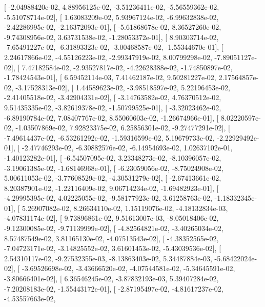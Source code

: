 \documentclass{article}
\begin{document}
       [ -2.04988420e-02,   4.88956125e-02,  -3.51236411e-02,
         -5.56559362e-02,  -5.51078714e-02],
       [  1.63083209e-02,   5.93967124e-02,  -6.99632838e-02,
         -2.42286995e-02,  -2.16372093e-01],
       [ -5.61868678e-02,   8.36527260e-02,  -9.74308956e-02,
          3.63731538e-02,  -1.28053372e-01],
       [  8.90303714e-02,  -7.65491227e-02,  -6.31893323e-02,
         -3.00468587e-02,  -1.55344670e-01],
       [  2.24617866e-02,  -4.55126223e-02,  -2.99347919e-02,
          8.00799298e-02,  -7.89051127e-02],
       [  7.47182584e-02,  -2.93527817e-02,  -4.22628388e-02,
         -1.74850897e-02,  -1.78424543e-01],
       [  6.59452114e-03,   7.41462187e-02,   9.50281227e-02,
          2.17564857e-02,  -3.17528313e-02],
       [  1.44589623e-02,  -3.98518597e-02,   5.22196453e-02,
         -2.41405518e-02,  -3.42904331e-02],
       [ -3.14763582e-02,   4.76370512e-02,   9.51435335e-02,
         -3.82619378e-02,  -1.50799525e-01],
       [ -3.32023462e-02,  -6.89190784e-02,   7.08407767e-02,
          8.55060603e-02,  -1.26674966e-01],
       [  8.02220597e-02,  -1.03507869e-02,   7.92823375e-02,
          6.25856301e-02,  -9.27477291e-02],
       [ -7.49614437e-02,  -6.53261292e-02,  -1.59316599e-02,
          5.19679733e-02,  -2.22929492e-01],
       [ -2.47746293e-02,  -6.30882576e-02,  -6.14954693e-02,
          1.02637102e-01,  -1.40123282e-01],
       [ -6.54507095e-02,   3.23348273e-02,  -8.10396057e-02,
         -3.19061385e-02,  -1.68146968e-01],
       [ -6.23059056e-02,  -8.75024908e-02,   5.00611053e-02,
         -3.77608529e-02,  -4.30531279e-02],
       [ -2.67413661e-02,   8.20387901e-02,  -1.22116409e-02,
          9.06714234e-02,  -1.69482923e-01],
       [ -4.29995395e-02,   4.02225055e-02,  -9.58177923e-02,
          3.61258763e-02,  -1.18332345e-01],
       [  5.26907082e-02,   8.26634110e-02,   1.15119076e-02,
         -4.18132834e-03,  -4.07831174e-02],
       [  9.73896861e-02,   9.51613007e-03,  -8.05018406e-02,
         -9.12300085e-02,  -9.71139999e-02],
       [ -4.82564821e-02,  -3.40265034e-02,   8.57487549e-02,
          3.81165130e-02,  -4.07513543e-02],
       [ -4.38352565e-02,  -7.04723171e-02,  -3.14825552e-02,
          3.61601453e-02,  -5.43039536e-02],
       [  2.54310117e-02,  -9.27532355e-03,  -8.13863403e-02,
          5.34487884e-03,  -5.68422024e-02],
       [ -3.69526698e-02,  -3.43666520e-02,  -4.07544581e-02,
         -5.34645591e-02,  -3.80666401e-02],
       [  6.36546245e-02,  -3.87832193e-03,   5.39407284e-02,
         -7.20208183e-02,  -1.55443172e-01],
       [ -2.87195497e-02,  -4.81617237e-02,  -4.53557663e-02,
\end{document}
